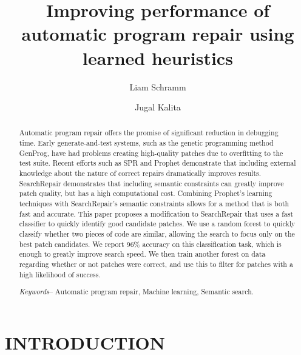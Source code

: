 \documentclass{paper}
\title{\LARGE \bf
Improving performance of automatic program repair using learned heuristics
}
\author{Liam Schramm}
\affil{Bard College}
\author{Jugal Kalita}
\affil{UCCS}
\begin{document}
\maketitle
\thispagestyle{empty}
\pagestyle{empty}


\begin{abstract}

Automatic program repair offers the promise of significant reduction in debugging time.
 Early generate-and-test systems, such as the genetic programming method GenProg, have had problems creating high-quality patches due to overfitting to the test suite. 
 Recent efforts such as SPR and Prophet demonstrate that including external knowledge about the nature of correct repairs dramatically improves results. SearchRepair demonstrates that including semantic constraints can greatly improve patch quality, but has a high computational cost.  
 Combining Prophet's learning techniques with SearchRepair's semantic constraints allows for a method that is both fast and accurate. 
 This paper proposes a modification to SearchRepair that uses a fast classifier to quickly identify good candidate patches. 
 We use a random forest to quickly classify whether two pieces of code are similar, allowing the search to focus only on the best patch candidates. We report 96\% accuracy on this classification task, which is enough to greatly improve search speed. 
 We then train another forest on data regarding whether or not patches were correct, and use this to filter for patches with a high likelihood of success.


\textit{Keywords}-- Automatic program repair, Machine learning, Semantic search.


\end{abstract}




\section{INTRODUCTION}
\end{document}
